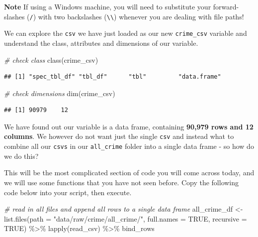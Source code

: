 \documentclass[
]{book}
\newenvironment{Shaded}{\begin{snugshade}}{\end{snugshade}}
\newcommand{\AttributeTok}[1]{\textcolor[rgb]{0.77,0.63,0.00}{#1}}
\newcommand{\CommentTok}[1]{\textcolor[rgb]{0.56,0.35,0.01}{\textit{#1}}}
\newcommand{\ConstantTok}[1]{\textcolor[rgb]{0.00,0.00,0.00}{#1}}
\newcommand{\FunctionTok}[1]{\textcolor[rgb]{0.00,0.00,0.00}{#1}}
\newcommand{\NormalTok}[1]{#1}
\newcommand{\OtherTok}[1]{\textcolor[rgb]{0.56,0.35,0.01}{#1}}
\newcommand{\SpecialCharTok}[1]{\textcolor[rgb]{0.00,0.00,0.00}{#1}}
\newcommand{\StringTok}[1]{\textcolor[rgb]{0.31,0.60,0.02}{#1}}
\begin{document}
\textbf{Note}
If using a Windows machine, you will need to substitute your forward-slashes (\texttt{/}) with two backslashes (\texttt{\textbackslash{}\textbackslash{}}) whenever you are dealing with file paths!

We can explore the \texttt{csv} we have just loaded as our new \texttt{crime\_csv} variable and understand the class, attributes and dimensions of our variable.

\begin{Shaded}
\begin{Highlighting}[]
\CommentTok{\# check class}
\FunctionTok{class}\NormalTok{(crime\_csv)}
\end{Highlighting}
\end{Shaded}

\begin{verbatim}
## [1] "spec_tbl_df" "tbl_df"      "tbl"         "data.frame"
\end{verbatim}

\begin{Shaded}
\begin{Highlighting}[]
\CommentTok{\# check dimensions}
\FunctionTok{dim}\NormalTok{(crime\_csv)}
\end{Highlighting}
\end{Shaded}

\begin{verbatim}
## [1] 90979    12
\end{verbatim}

We have found out our variable is a data frame, containing \textbf{90,979 rows and 12 columns}. We however do not want just the single \texttt{csv} and instead what to combine all our \texttt{csv\textquotesingle{}s} in our \texttt{all\_crime} folder into a single data frame - so how do we do this?

This will be the most complicated section of code you will come across today, and we will use some functions that you have not seen before. Copy the following code below into your script, then execute.

\begin{Shaded}
\begin{Highlighting}[]
\CommentTok{\# read in all files and append all rows to a single data frame}
\NormalTok{all\_crime\_df }\OtherTok{\textless{}{-}} \FunctionTok{list.files}\NormalTok{(}\AttributeTok{path =} \StringTok{"data/raw/crime/all\_crime/"}\NormalTok{, }\AttributeTok{full.names =} \ConstantTok{TRUE}\NormalTok{,}
    \AttributeTok{recursive =} \ConstantTok{TRUE}\NormalTok{) }\SpecialCharTok{\%\textgreater{}\%}
    \FunctionTok{lapply}\NormalTok{(read\_csv) }\SpecialCharTok{\%\textgreater{}\%}
\NormalTok{    bind\_rows}
\end{Highlighting}
\end{Shaded}
\end{document}
